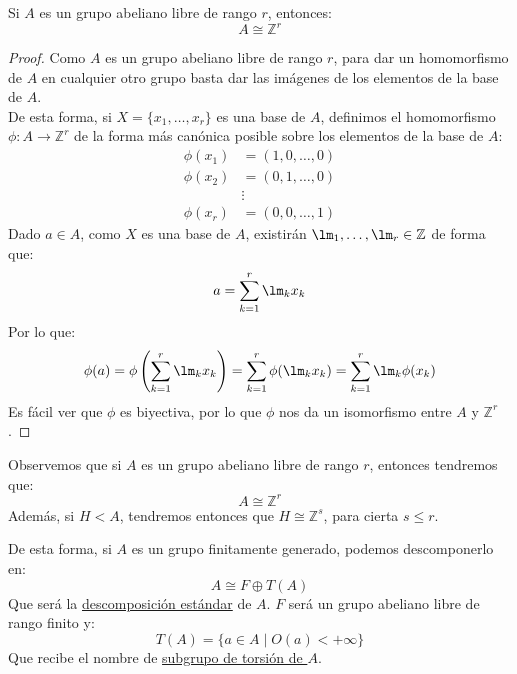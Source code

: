 \begin{prop}
    Si $A$ es un grupo abeliano libre de rango $r$, entonces:
    \begin{equation*}
        A\cong \mathbb{Z}^r
    \end{equation*}
    \begin{proof}
        Como $A$ es un grupo abeliano libre de rango $r$, para dar un homomorfismo de $A$ en cualquier otro grupo basta dar las imágenes de los elementos de la base de $A$.\\

        \noindent
        De esta forma, si $X = \{x_1,\ldots,x_r\}$ es una base de $A$, definimos el homomorfismo $\phi:A\to \mathbb{Z}^r$ de la forma más canónica posible sobre los elementos de la base de $A$:
        \begin{align*}
            \phi(x_1) &= (1, 0, \ldots, 0) \\
            \phi(x_2) &= (0, 1, \ldots, 0) \\
                      &\vdots \\
            \phi(x_r) &= (0, 0, \ldots, 1)
        \end{align*}
        Dado $a\in A$, como $X$ es una base de $A$, existirán $\lm_1,\ldots,\lm_r\in \mathbb{Z}$ de forma que:
        \begin{equation*}
            a = \sum_{k=1}^{r}\lm_kx_k
        \end{equation*}
        Por lo que:
        \begin{equation*}
            \phi(a) = \phi\left(\sum_{k=1}^{r}\lm_kx_k\right) = \sum_{k=1}^{r}\phi(\lm_kx_k) = \sum_{k=1}^{r}\lm_k \phi(x_k)
        \end{equation*}
        Es fácil ver que $\phi$ es biyectiva, por lo que $\phi$ nos da un isomorfismo entre $A$ y $\mathbb{Z}^r$.
    \end{proof}
\end{prop}




\begin{observacion}
    Observemos que si $A$ es un grupo abeliano libre de rango $r$, entonces tendremos que:
    \begin{equation*}
        A \cong \mathbb{Z}^r
    \end{equation*}
    Además, si $H < A$, tendremos entonces que $H\cong \mathbb{Z}^s$, para cierta $s\leq r$.
\end{observacion}

\noindent
De esta forma, si $A$ es un grupo finitamente generado, podemos descomponerlo en:
\begin{equation*}
    A\cong F \oplus T(A)
\end{equation*}
Que será la \underline{descomposición estándar} de $A$. $F$ será un grupo abeliano libre de rango finito y:
\begin{equation*}
    T(A) = \{a\in A \mid O(a) < +\infty\}
\end{equation*}
Que recibe el nombre de \underline{subgrupo de torsión de $A$}. %

